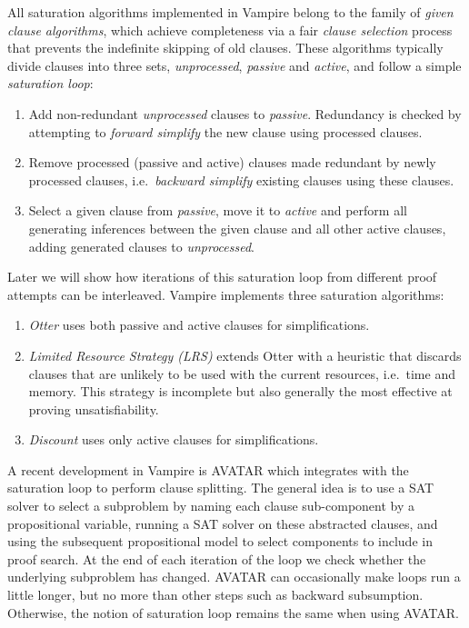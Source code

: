 \documentclass{llncs}
\begin{document}
All saturation algorithms implemented in Vampire belong to the family of \emph{given clause algorithms}, which achieve completeness via a fair \emph{clause selection} process that prevents the indefinite skipping of old clauses. These algorithms typically divide clauses into three sets, \emph{unprocessed}, \emph{passive} and \emph{active}, and follow a simple \emph{saturation loop}:
\begin{enumerate}
	\item Add non-redundant \emph{unprocessed} clauses to \emph{passive}. Redundancy is checked by attempting to \emph{forward simplify} the new clause using processed clauses.
	\item Remove processed (passive and active) clauses made redundant by newly processed clauses, i.e.\ \emph{backward simplify} existing clauses using these clauses.
	\item Select a given clause from \emph{passive}, move it to \emph{active} 
	and perform all generating inferences between the given clause and all other active clauses,
	adding generated clauses to \emph{unprocessed}.
\end{enumerate}
Later we will show how iterations of this saturation loop from different proof attempts can be interleaved. Vampire implements three saturation  algorithms:
\begin{enumerate}
	\item \emph{Otter} uses both passive and active clauses for simplifications.
	\item \emph{Limited Resource Strategy (LRS)} \cite{LRS} extends Otter with a heuristic
	   that discards clauses that are unlikely to be used with the current resources, i.e.\ time and memory.
		 This strategy is incomplete but also generally the most effective at proving unsatisfiability.
	\item \emph{\sc Discount} uses only active clauses for simplifications.
\end{enumerate}
A recent development in Vampire is AVATAR \cite{avatar,playing} which integrates with the saturation loop to perform clause splitting. The general idea is to use a SAT solver to select a subproblem by naming each clause sub-component by a propositional variable, running a SAT solver on these abstracted clauses, and using the subsequent propositional model to select components to include in proof search. 
At the end of each iteration of the loop we check whether the underlying subproblem has changed. AVATAR can occasionally make loops run a little longer, but no more than other steps such as backward subsumption. Otherwise, the notion of saturation loop remains the same when using AVATAR.
\end{document}
